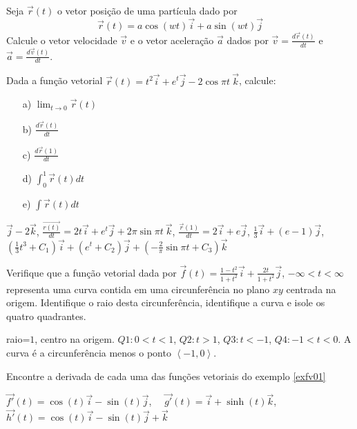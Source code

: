 \begin{exer}Seja $\vec{r}(t)$ o vetor posição de uma partícula dado por
$$\vec{r}(t)=a\cos(wt)\vec{i}+a\sin(wt)\vec{j}$$
Calcule o vetor velocidade $\vec{v}$ e o vetor aceleração $\vec{a}$ dados por $\vec{v}=\frac{d\vec{r}(t)}{dt}$ e $\vec{a}=\frac{d\vec{v}(t)}{dt}$.
\end{exer}

\begin{exer} Dada a função vetorial $\vec{r}(t)=t^2\vec{i}+e^t\vec{j}-2\cos\pi t ~\! \vec{k}$, calcule:
\begin{itemize}
\item [a)] $\displaystyle \lim_{t\to 0} \vec{r}(t)$
\item [b)] $\displaystyle \frac{d \vec{r}(t)}{dt}$
\item [c)] $\displaystyle \frac{d\vec{r}(1)}{dt}$
\item [d)] $\displaystyle \int_0^1 \vec{r}(t)dt$
\item [e)] $\displaystyle \int \vec{r}(t)dt$
\end{itemize}
\end{exer}
\begin{resp} $\vec{j}-2\vec{k}$, $\frac{\vec{r(t)}}{dt}=2t\vec{i}+e^t\vec{j}+2\pi\sin\pi t ~\! \vec{k}$, $\frac{\vec{r}(1)}{dt}=2\vec{i}+e\vec{j}$, $\frac{1}{3}\vec{i}+(e-1)\vec{j}$, $\left(\frac{1}{3}t^3+C_1\right)\vec{i}+\left(e^t+C_2\right)\vec{j}+\left(-\frac{2}{\pi}\sin\pi t+C_3\right)\vec{k}$
\end{resp}

\begin{exer} Verifique que a função vetorial dada por $\vec{f}(t)=\frac{1-t^2}{1+t^2}\vec{i}+\frac{2t}{1+t^2}\vec{j}$, $-\infty<t<\infty$
representa uma curva contida em uma circunferência no plano $xy$  centrada na origem. Identifique o raio desta circunferência, identifique a curva e isole os quatro quadrantes.
\end{exer}

\begin{resp}raio=$1$, centro na origem. $Q1: 0<t<1$, $Q2:t>1$, $Q3:t<-1$, $Q4:-1<t<0$. A curva é a circunferência menos o ponto $\left<-1,0\right>$.
\end{resp}


\begin{exer}Encontre a derivada de cada uma das funções vetoriais do exemplo \ref{exfv01}
\end{exer}

\begin{resp} $\vec{f'}(t)=\cos(t)\vec{i}-\sin(t)\vec{j}$,~~ $\vec{g'}(t)= \vec{i}+\sinh(t)\vec{k}$, ~~$\vec{h'}(t)=\cos(t)\vec{i}-\sin(t)\vec{j}+\vec{k}$\end{resp}

